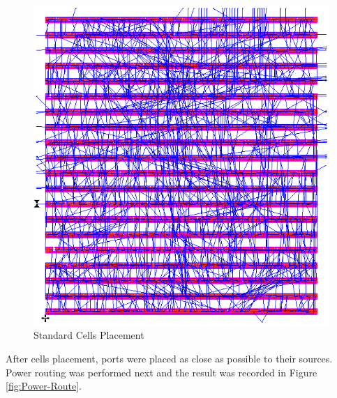 \documentclass[11pt]{article}
\begin{document}
		\begin{figure}[H] 
			\centering 
			\includegraphics[width=\textwidth,height=\dimexpr\textheight-4\baselineskip-\abovecaptionskip-\belowcaptionskip\relax,keepaspectratio]{"Pictures/Std Cells"}
			\caption{Standard Cells Placement} 
			\label{fig:Std-Cells} 
		\end{figure}
	
		After cells placement, ports were placed as close as possible to their sources. Power routing was performed next and the result was recorded in Figure \ref{fig:Power-Route}.
		
\end{document}
